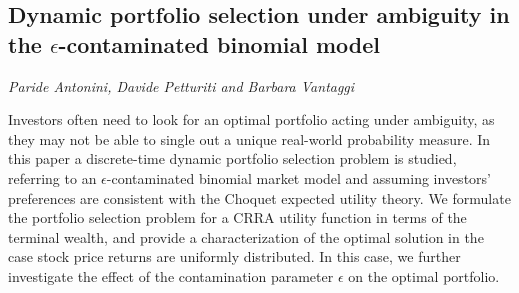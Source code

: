 \documentclass[../booklet.tex]{subfiles}
\begin{document}
\subsection[Dynamic portfolio selection under ambiguity in the $\epsilon$-contaminated binomial model. {\it Paride Antonini, Davide Petturiti and Barbara Vantaggi}]{Dynamic portfolio selection under ambiguity in the $\epsilon$-contaminated binomial model}
  

\begin{center}
  {\it Paride Antonini, Davide Petturiti and Barbara Vantaggi}
\end{center}



Investors often need to look for an optimal portfolio acting under ambiguity, as they may not be able to single out a unique real-world probability measure. In this paper a discrete-time dynamic portfolio selection problem is studied, referring to an $\epsilon$-contaminated binomial market model and assuming investors' preferences
are consistent with the Choquet expected utility theory.  We formulate the portfolio selection problem for a CRRA utility function in terms of the terminal wealth, and provide a characterization of the optimal solution in the case stock price returns are uniformly distributed. In this case, we further
investigate the effect of the contamination parameter $\epsilon$ on the optimal portfolio.
\end{document}
